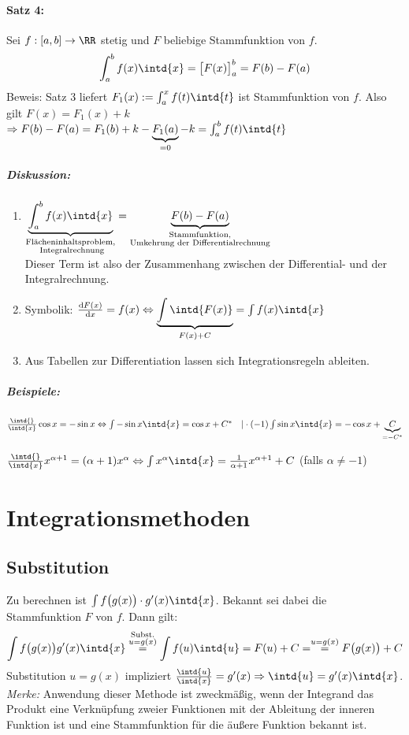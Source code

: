 \paragraph{Satz 4:} Sei $f:[a,b]\to \RR$ stetig und $F$ beliebige Stammfunktion von $f$.
\[\int_a^b f(x) \intd{x}=\big[F(x)\big]_a^b=F(b)-F(a)\]
Beweis: Satz 3 liefert $F_1(x):=\int_a^x f(t) \intd{t}$ ist Stammfunktion von $f$. Also gilt $F(x)=F_1(x)+k$\\
$\Rightarrow F(b)-F(a)=F_1(b)+k-\underbrace{F_1(a)}_{=0}-k = \int_a^bf(t)\intd{t}$
\subparagraph{Diskussion:}
\begin{enumerate}
\item $\underbrace{\int_a^b f(x) \intd{x}}_{\substack{\text{Flächeninhaltsproblem,}\\\text{ Integralrechnung}}}=\underbrace{F(b)-F(a)}_{\substack{\text{Stammfunktion,}\\\text{Umkehrung der Differentialrechnung}}}$\\
Dieser Term ist also der Zusammenhang zwischen der Differential- und der Integralrechnung.
\item Symbolik: $\frac{\mathrm{d}F(x)}{\mathrm{d}x}=f(x) \Leftrightarrow \underbrace{\int \intd{F(x)}}_{F(x)+C}=\int f(x) \intd{x}$
\item Aus Tabellen zur Differentiation lassen sich Integrationsregeln ableiten.
\end{enumerate}
\subparagraph{Beispiele:}
\begin{anumerate}
\item $\frac{\intd{}}{\intd{x}}\cos x = - \sin x \\
\Leftrightarrow \int -\sin x \intd{x}=\cos x + C^* \quad |\cdot (-1)\\
\int \sin x \intd{x}= - \cos x + \underbrace{C}_{=-C^*}$
\item $\frac{\intd{}}{\intd{x}}x^{\alpha+1}=(\alpha+1)x^\alpha\\
\Leftrightarrow \int x^\alpha \intd{x} = \frac{1}{\alpha +1} x^{\alpha +1} + C$ (falls $\alpha \not = -1$)
\end{anumerate}
\section{Integrationsmethoden}
\subsection{Substitution}
Zu berechnen ist $\int f\big(g(x)\big)\cdot g'(x) \intd{x}$. Bekannt sei dabei die Stammfunktion $F$ von $f$. Dann gilt:
\[\int f\big( g(x) \big) g'(x) \intd{x}\overset{\substack{\text{Subst.}\\ u=g(x)}}{=}\int f(u) \intd{u}=F(u) + C =\overset{u=g(x)}{=}F\big(g(x)\big)+C \]
Substitution $u=g(x)$ impliziert $\frac{\intd{u}}{\intd{x}}=g'(x) \Rightarrow \intd{u}=g'(x) \intd{x}$.\\
\emph{Merke:} Anwendung dieser Methode ist zweckmäßig, wenn der Integrand das Produkt eine Verknüpfung zweier Funktionen mit der Ableitung der inneren Funktion ist und eine Stammfunktion für die äußere Funktion bekannt ist.
